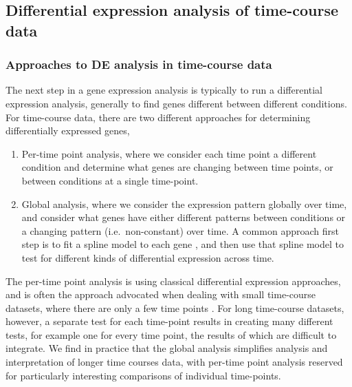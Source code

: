 \documentclass[9pt,a4paper,]{extarticle}
\begin{document}
\hypertarget{differential-expression-analysis-of-time-course-data}{%
\subsection{Differential expression analysis of time-course data}\label{differential-expression-analysis-of-time-course-data}}

\hypertarget{approaches-to-de-analysis-in-time-course-data}{%
\subsubsection{Approaches to DE analysis in time-course data}\label{approaches-to-de-analysis-in-time-course-data}}

The next step in a gene expression analysis is typically to run a differential
expression analysis, generally to find genes different between different
conditions. For time-course data, there are two different approaches for
determining differentially expressed genes,

\begin{enumerate}
\def\labelenumi{\arabic{enumi})}
\item
  Per-time point analysis, where we consider each time point a different
  condition and determine what genes are changing between time points, or
  between conditions at a single time-point.
\item
  Global analysis, where we consider the expression pattern globally over
  time, and consider what genes have either different patterns between
  conditions or a changing pattern (i.e.~non-constant) over time. A common
  approach first step is to fit a spline model to each gene
  \citep{storey:significance},
  and then use that spline model to test for different kinds of differential
  expression across time.
\end{enumerate}

The per-time point analysis is using classical differential expression
approaches, and is often the approach advocated when dealing with small
time-course datasets, where there are only a few time points \citep{ritchie:limma, robinson:edgeR, love:moderated} . For long time-course datasets, however, a
separate test for each time-point results in creating many different tests,
for example one for every time point, the results of which are difficult to
integrate. We find in practice that the global analysis simplifies analysis
and interpretation of longer time courses data, with per-time point analysis
reserved for particularly interesting comparisons of individual time-points.
\end{document}
